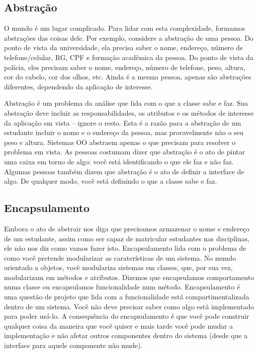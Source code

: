 \documentclass[
	article,			%
	12pt,				%
	openright,
	twoside,			%
	a4paper,			%
	english,			%
	french,
	brazil,				%
	sumario=tradicional
	]{abntex2}
\begin{document}
\subsection{Abstração}

O mundo é um lugar complicado. Para lidar com esta complexidade, formamos abstrações das coisas dele. Por exemplo, considere a abstração de uma pessoa. Do ponto de vista da universidade, ela precisa saber o nome, endereço, número de telefone/celular, RG, CPF e formação acadêmica da pessoa. Do ponto de vista da polícia, eles precisam saber o nome, endereço, número de telefone, peso, altura, cor do cabelo, cor dos olhos, etc. Ainda é a mesma pessoa, apenas são abstrações diferentes, dependendo da aplicação de interesse.

Abstração é um problema da análise que lida com o que a classe sabe e faz. Sua abstração deve incluir as responsabilidades, os atributos e os métodos de interesse da aplicação em vista -- ignore o resto. Esta é a razão para a abstração de um estudante incluir o nome e o endereço da pessoa, mas provavelmente não o seu peso e altura. Sistemas OO abstraem apenas o que precisam para resolver o problema em vista. As pessoas costumam dizer que abstração é o ato de pintar uma caixa em torno de algo: você está identificando o que ele faz e não faz. Algumas pessoas também dizem que abstração é o ato de definir a interface de algo. De qualquer modo, você está definindo o que a classe sabe e faz.

\subsection{Encapsulamento}

Embora o ato de abstrair nos diga que precisamos armazenar o nome e endereço de um estudante, assim como ser capaz de matricular estudantes nas disciplinas, ele não nos diz como vamos fazer isto. Encapsulamento lida com o problema de como você pretende modularizar as caraterísticas de um sistema. No mundo orientado a objetos, você modulariza sistemas em classes, que, por sua vez, modularizam em métodos e atributos. Dizemos que encapsulamos comportamento numa classe ou encapsulamos funcionalidade num método. Encapsulamento é uma questão de projeto que lida com a funcionalidade está compartimentalizada dentro de um sistema. Você não deve precisar saber como algo está implementado para poder usá-lo. A consequência do encapsulamento é que você pode construir qualquer coisa da maneira que você quiser e mais tarde você pode mudar a implementação e não afetar outros componentes dentro do sistema (desde que a interface para aquele componente não mude).
\end{document}
